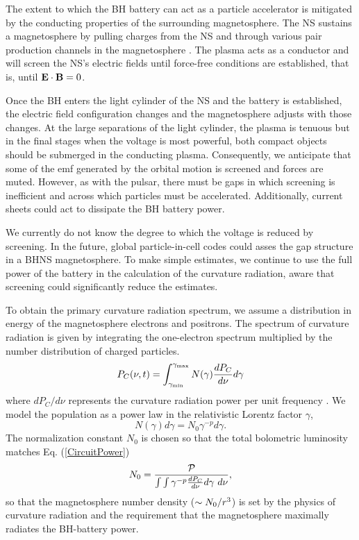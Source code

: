 The extent to which the BH battery can act as a particle accelerator
is mitigated by the conducting properties of the surrounding
magnetosphere. The NS sustains a magnetosphere by pulling charges from
the NS and through various pair production channels in the
magnetosphere \citep{GJ:1969, RudSuth:1975}.  The plasma acts as a
conductor and will screen the NS's electric fields until force-free
conditions are established, that is, until ${\bf E} \cdot {\bf B} =0$.

Once the BH enters the light cylinder of the NS and the battery is
established, the electric field configuration changes and the
magnetosphere adjusts with those changes. At the large separations of
the light cylinder, the plasma is tenuous but in the final stages when
the voltage is most powerful, both compact objects should be submerged
in the conducting plasma. Consequently, we anticipate that some of the
emf generated by the orbital motion is screened and forces are
muted. However, as with the pulsar, there must be gaps in which
screening is inefficient and across which particles must be
accelerated. Additionally, current sheets could act to dissipate the
BH battery power.

We currently do not know the degree to which the voltage is reduced by
screening. In the future, global particle-in-cell codes could asses
the gap structure in a BHNS magnetosphere. To make simple estimates,
we continue to use the full power of the battery in the calculation of
the curvature radiation, aware that screening could significantly
reduce the estimates.
 
 
To obtain the primary curvature radiation spectrum, we assume a
distribution in energy of the magnetosphere electrons and
positrons. The spectrum of curvature radiation is given by integrating
the one-electron spectrum multiplied by the number distribution of
charged particles.
\begin{equation}
\label{PofOmega}
P_C(\nu,t) = \int^{\gamma_{\rm max}}_{\gamma_{\rm min}}{ N(\gamma)
  \frac{dP_{C}}{ d \nu} d\gamma}
\end{equation}
where $dP_C/d\nu$ represents the curvature radiation power per unit
frequency \citep[\textit{e.g},][]{CZ_SC:1996}.  We model the
population as a power law in the relativistic Lorentz factor $\gamma$,
          \begin{equation}
           \label{New:PowerLawElecs}
          N(\gamma) d\gamma = N_0 \gamma^{-p} d\gamma.
          \end{equation} 
The normalization constant $N_0$ is chosen so that the total
bolometric luminosity matches Eq. (\ref{CircuitPower})
\begin{equation}
N_0 = \frac{ \mathcal{P} }{ \int{ \int{ \gamma^{-p} \frac{dP_{C}}{ d \nu} d\gamma} \ d\nu} },
\end{equation}
so that the magnetosphere number density ($\sim N_0/r^3$) is set
by the physics of curvature radiation and the requirement that the
magnetosphere maximally radiates the BH-battery power.


